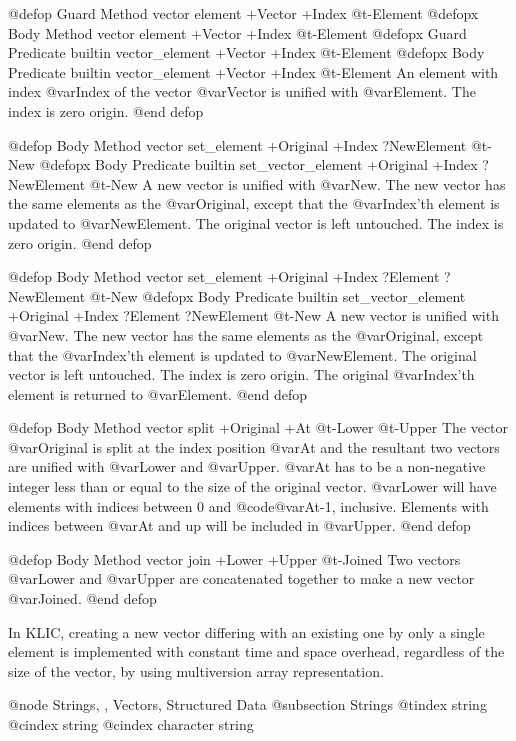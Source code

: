 {{@defop {Guard Method} vector element +Vector +Index @t{-}Element
@defopx {Body Method} vector element +Vector +Index @t{-}Element
@defopx {Guard Predicate} {builtin} vector_element +Vector +Index @t{-}Element
@defopx {Body Predicate} {builtin} vector_element +Vector +Index @t{-}Element
An element with index @var{Index} of the vector @var{Vector} is unified
with @var{Element}.  The index is zero origin.
@end defop

@defop {Body Method} vector set_element +Original +Index ?NewElement @t{-}New
@defopx {Body Predicate} {builtin} set_vector_element +Original +Index ?NewElement @t{-}New
A new vector is unified with @var{New}.  The new vector has the same
elements as the @var{Original}, except that the @var{Index}'th element is
updated to @var{NewElement}.  The original vector is left untouched.
The index is zero origin.
@end defop

@defop {Body Method} vector set_element +Original +Index ?Element ?NewElement @t{-}New
@defopx {Body Predicate} {builtin} set_vector_element +Original +Index ?Element ?NewElement @t{-}New
A new vector is unified with @var{New}.  The new vector has the same
elements as the @var{Original}, except that the @var{Index}'th element
is updated to @var{NewElement}.  The original vector is left untouched.
The index is zero origin.  The original @var{Index}'th element is
returned to @var{Element}.
@end defop

@defop {Body Method} vector split +Original +At @t{-}Lower @t{-}Upper
The vector @var{Original} is split at the index position @var{At} and
the resultant two vectors are unified with @var{Lower} and @var{Upper}.
@var{At} has to be a non-negative integer less than or equal to the size
of the original vector.  @var{Lower} will have elements with indices
between 0 and @code{@var{At}-1}, inclusive.  Elements with indices
between @var{At} and up will be included in @var{Upper}.
@end defop

@defop {Body Method} vector join +Lower +Upper @t{-}Joined
Two vectors @var{Lower} and @var{Upper} are concatenated together to
make a new vector @var{Joined}.
@end defop

In KLIC, creating a new vector differing with an existing one by only a
single element is implemented with constant time and space overhead,
regardless of the size of the vector, by using multiversion array
representation.

@node Strings,  , Vectors, Structured Data
@subsection Strings
@tindex string
@cindex string
@cindex character string

}}
